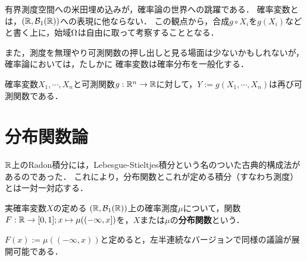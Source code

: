 \documentclass[uplatex,dvipdfmx]{jsreport}
\begin{document}
\begin{tcolorbox}[colframe=ForestGreen, colback=ForestGreen!10!white,breakable,colbacktitle=ForestGreen!40!white,coltitle=black,fonttitle=\bfseries\sffamily,
title=]
    有界測度空間への米田埋め込みが，確率論の世界への跳躍である．
    確率変数とは，$(\mathbb{R},\mathcal{B}_1(\mathbb{R}))$への表現に他ならない．
    この観点から，合成$g\circ X_i$を$g(X_i)$などと書く上に，始域$\Omega$は自由に取って考察することとなる．

    また，測度を無理やり可測関数の押し出しと見る場面は少ないかもしれないが，確率論においては，たしかに
    確率変数は確率分布を一般化する．
\end{tcolorbox}

\begin{proposition}[確率変数の構成]
    確率変数$X_1,\cdots,X_n$と可測関数$g:\mathbb{R}^n\to\mathbb{R}$に対して，$Y:=g(X_1,\cdots,X_n)$は再び可測関数である．
\end{proposition}

\section{分布関数論}

\begin{tcolorbox}[colframe=ForestGreen, colback=ForestGreen!10!white,breakable,colbacktitle=ForestGreen!40!white,coltitle=black,fonttitle=\bfseries\sffamily,
title=]
    $\mathbb{R}$上のRadon積分には，Lebesgue-Stieltjes積分という名のついた古典的構成法があるのであった．
    これにより，分布関数とこれが定める積分（すなわち測度）とは一対一対応する．
\end{tcolorbox}

\begin{definition}
    実確率変数$X$の定める
    $(\mathbb{R},\mathcal{B}_1(\mathbb{R}))$上の確率測度$\mu$について，関数$F:\mathbb{R}\to[0,1];x\mapsto\mu((-\infty,x])$を，$X$または$\mu$の\textbf{分布関数}という．
\end{definition}
\begin{remark}
    $F(x):=\mu((-\infty,x))$と定めると，左半連続なバージョンで同様の議論が展開可能である．
\end{remark}
\end{document}
